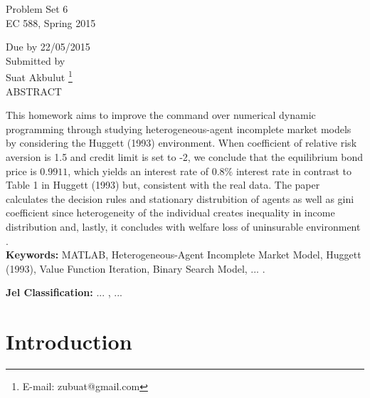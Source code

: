 \documentclass[a4paper,10pt,12pt]{article}%
\begin{document}
\def\symbolfootnote[#1]#2{\begingroup%
\def\thefootnote{\fnsymbol{footnote}}\footnote[#1]{#2}\endgroup} 

\renewcommand\baselinestretch{1.6}
\small\large\normalsize

\begin{center}


{\LARGE Problem Set 6 }\\[0.6cm]
{\large   EC 588, Spring 2015 } 


{\large Due by 22/05/2015}\\[1.0cm]

Submitted by\\
{\Large Suat Akbulut} 
\footnote{E-mail: zubuat@gmail.com} \\[0.6cm]


{ABSTRACT}

\end{center}
{\small  This  homework aims to improve the command over numerical dynamic programming through studying 
heterogeneous-agent incomplete market models by considering the Huggett (1993) environment. When coefficient of relative risk aversion is 1.5 and credit limit is set to -2, we conclude that the equilibrium bond price is $0.9911$, which yields an interest rate of $0.8\%$ interest rate in contrast to Table 1 in Huggett (1993) but, consistent with the real data. The paper calculates the decision rules and stationary distrubition of agents as well as gini coefficient since heterogeneity of the individual creates inequality in income distribution and, lastly, it concludes with welfare loss of uninsurable environment  . } \\[0.4cm]


{\bf Keywords:} MATLAB,  Heterogeneous-Agent Incomplete Market Model, Huggett (1993), Value Function Iteration, Binary Search Model, ... .

{\bf Jel Classification:} ... , ... 


\newpage


\section*{Introduction}
 
\end{document}
